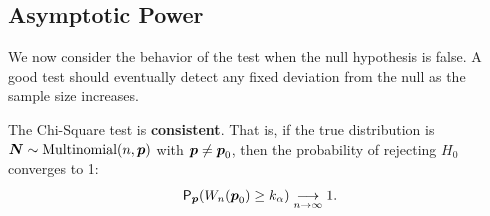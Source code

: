 \subsection{Asymptotic Power}
\label{sub:Asymptotic Power}

We now consider the behavior of the test when the null hypothesis is false. A good test should eventually detect any fixed deviation from the null as the sample size increases.

\begin{theo}
    \label{thm:consistency}
    The Chi-Square test is \textbf{consistent}. That is, if the true distribution is $\boldsymbol{N} \sim \text{Multinomial}(n, \boldsymbol{p})$ with $\boldsymbol{p} \neq \boldsymbol{p}_0$, then the probability of rejecting $H_0$ converges to 1:
    \[
        \mathsf{P}_{\boldsymbol{p}}(W_n(\boldsymbol{p}_0) \ge k_\alpha) \underset{n \to \infty}{\longrightarrow} 1.
    \]
\end{theo}



